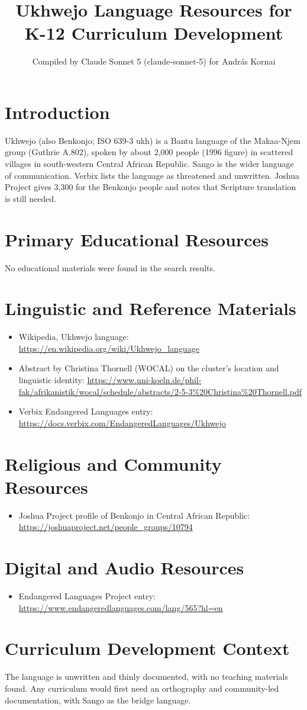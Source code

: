 \documentclass[12pt]{article}
\title{Ukhwejo Language Resources for K-12 Curriculum Development}
\author{Compiled by Claude Sonnet 5 (claude-sonnet-5) for Andr\'as Kornai}
\date{}
\begin{document}
\maketitle
\section{Introduction}
Ukhwejo (also Benkonjo; ISO 639-3 ukh) is a Bantu language of the Makaa-Njem group (Guthrie A.802), spoken by about 2,000 people (1996 figure) in scattered villages in south-western Central African Republic. Sango is the wider language of communication. Verbix lists the language as threatened and unwritten. Joshua Project gives 3,300 for the Benkonjo people and notes that Scripture translation is still needed.
\section{Primary Educational Resources}
No educational materials were found in the search results.
\section{Linguistic and Reference Materials}
\begin{itemize}
\item Wikipedia, Ukhwejo language: \url{https://en.wikipedia.org/wiki/Ukhwejo_language}
\item Abstract by Christina Thornell (WOCAL) on the cluster's location and linguistic identity: \url{https://www.uni-koeln.de/phil-fak/afrikanistik/wocal/schedule/abstracts/2-5-3%20Christina%20Thornell.pdf}
\item Verbix Endangered Languages entry: \url{https://docs.verbix.com/EndangeredLanguages/Ukhwejo}
\end{itemize}
\section{Religious and Community Resources}
\begin{itemize}
\item Joshua Project profile of Benkonjo in Central African Republic: \url{https://joshuaproject.net/people_groups/10794}
\end{itemize}
\section{Digital and Audio Resources}
\begin{itemize}
\item Endangered Languages Project entry: \url{https://www.endangeredlanguages.com/lang/565?hl=en}
\end{itemize}
\section{Curriculum Development Context}
The language is unwritten and thinly documented, with no teaching materials found. Any curriculum would first need an orthography and community-led documentation, with Sango as the bridge language.
\end{document}
